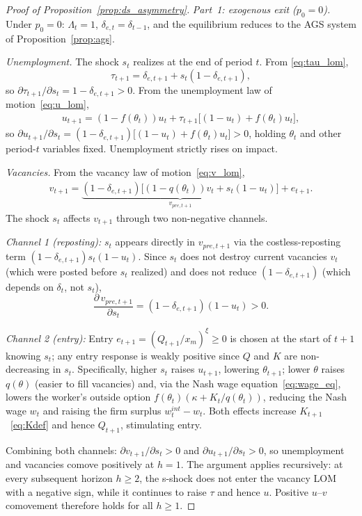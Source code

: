 \documentclass[authoryear, review, 12pt]{elsarticle}
\begin{document}
\begin{proof}[Proof of Proposition~\ref{prop:ds_asymmetry}]
\emph{Part~1: exogenous exit ($p_0=0$).}
Under $p_0=0$: $\Lambda_t=1$, $\delta_{e,t}=\delta_{t-1}$, and the
equilibrium reduces to the AGS system of Proposition~\ref{prop:ags}.

\medskip\noindent\emph{Unemployment.}
The shock $s_t$ realizes at the end of period $t$.  From
\eqref{eq:tau_lom},
\[
	\tau_{t+1} = \delta_{e,t+1} + s_t(1-\delta_{e,t+1}),
\]
so $\partial\tau_{t+1}/\partial s_t = 1-\delta_{e,t+1} > 0$.
From the unemployment law of motion~\eqref{eq:u_lom},
\begin{align}\label{eq:u_lom_proof}
	u_{t+1}
	= (1-f(\theta_t))u_t
	  + \tau_{t+1}\bigl[(1-u_t)+f(\theta_t)u_t\bigr],
\end{align}
so $\partial u_{t+1}/\partial s_t
= (1-\delta_{e,t+1})\bigl[(1-u_t)+f(\theta_t)u_t\bigr] > 0$,
holding $\theta_t$ and other period-$t$ variables fixed.
Unemployment strictly rises on impact.

\medskip\noindent\emph{Vacancies.}
From the vacancy law of motion~\eqref{eq:v_lom},
\begin{align}\label{eq:v_lom_proof}
	v_{t+1}
	= \underbrace{(1-\delta_{e,t+1})
		\bigl[(1-q(\theta_t))v_t
		+s_t(1-u_t)\bigr]}_{v_{pre,t+1}}
	+ e_{t+1}.
\end{align}
The shock $s_t$ affects $v_{t+1}$ through two non-negative channels.

\emph{Channel 1 (reposting):}
$s_t$ appears directly in $v_{pre,t+1}$ via the costless-reposting
term $(1-\delta_{e,t+1})s_t(1-u_t)$.
Since $s_t$ does not destroy current vacancies $v_t$ (which were
posted before $s_t$ realized) and does not reduce $(1-\delta_{e,t+1})$
(which depends on $\delta_t$, not $s_t$),
\[
	\frac{\partial\,v_{pre,t+1}}{\partial s_t}
	= (1-\delta_{e,t+1})(1-u_t) > 0.
\]

\emph{Channel 2 (entry):}
Entry $e_{t+1}=(Q_{t+1}/x_m)^\xi\geq 0$ is chosen at the start of
$t+1$ knowing $s_t$; any entry response is weakly positive since $Q$
and $K$ are non-decreasing in $s_t$.
Specifically, higher $s_t$ raises $u_{t+1}$, lowering $\theta_{t+1}$;
lower $\theta$ raises $q(\theta)$ (easier to fill vacancies) and, via
the Nash wage equation~\eqref{eq:wage_eq}, lowers the worker's outside
option $f(\theta_t)(\kappa+K_t/q(\theta_t))$, reducing the Nash wage
$w_t$ and raising the firm surplus $w_t^{int}-w_t$.
Both effects increase $K_{t+1}$~\eqref{eq:Kdef} and hence $Q_{t+1}$,
stimulating entry.

Combining both channels:
$\partial v_{t+1}/\partial s_t > 0$ and
$\partial u_{t+1}/\partial s_t > 0$,
so unemployment and vacancies comove positively at $h=1$.
The argument applies recursively: at every subsequent horizon
$h\geq 2$, the s-shock does not enter the vacancy LOM with a
negative sign, while it continues to raise $\tau$ and hence $u$.
Positive $u$--$v$ comovement therefore holds for all $h\geq 1$.


\end{proof}
\end{document}
